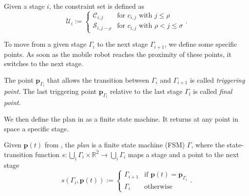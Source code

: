 \begin{highlight}
  \begin{defn}\label{def:const-set}
    Given a stage $i$, the constraint set is defined as
    \begin{equation*}
      \mathcal{U}_i:=\begin{cases}
        \mathcal{C}_{i,j} & \text{for } c_{i,j} \text{ with } j\leq\rho\\
        \mathcal{S}_{i,j-\rho} & \text{for } c_{i,j} \text{ with } \rho<j\leq\sigma
      \end{cases}.
    \end{equation*}
    
  \end{defn}
\end{highlight}

To move from a given stage $\Gamma_i$ to the next stage $\Gamma_{i+1}$, we define some specific points. As soon as the mobile robot reaches the proximity of these points, it switches to the next stage.

\begin{highlight}  
  \begin{defn}\label{def:trigs}
    The point $\mathbf{p}_{\Gamma_{i}}$ that allows the transition between $\Gamma_i$ and $\Gamma_{i+1}$ is called \emph{triggering point}. The last triggering point $\mathbf{p}_{\Gamma_{l}}$ relative to the last stage $\Gamma_l$ is called \emph{final point}.
  \end{defn}
\end{highlight}

We then define the plan in  as a finite state machine. It returns at any point in space a specific stage.

\begin{highlight}  
  \begin{defn}[Plan]\label{def:plan}
    Given $\mathbf{p}(t)$ from , the \emph{plan} is a finite state machine (FSM) $\Gamma$, where the state-transition function $s:\bigcup_i{\Gamma_i}\times\mathbb{R}^2\rightarrow\bigcup_i{\Gamma_i}$ maps a stage and a point to the next stage
    \begin{equation*}s(\Gamma_i,\mathbf{p}(t)):=\begin{cases}
      \Gamma_{i+1} & \text{if }\mathbf{p}(t)=\mathbf{p}_{\Gamma_i}\\
      \Gamma_i & \text{otherwise}
    \end{cases}.\end{equation*}
  \end{defn}
\end{highlight}

